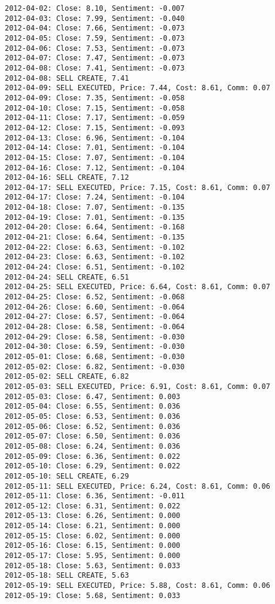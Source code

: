 \documentclass[11pt]{article}
\begin{document}
\begin{Verbatim}[commandchars=\\\{\}]
2012-04-02: Close: 8.10, Sentiment: -0.007
2012-04-03: Close: 7.99, Sentiment: -0.040
2012-04-04: Close: 7.66, Sentiment: -0.073
2012-04-05: Close: 7.59, Sentiment: -0.073
2012-04-06: Close: 7.53, Sentiment: -0.073
2012-04-07: Close: 7.47, Sentiment: -0.073
2012-04-08: Close: 7.41, Sentiment: -0.073
2012-04-08: SELL CREATE, 7.41
2012-04-09: SELL EXECUTED, Price: 7.44, Cost: 8.61, Comm: 0.07
2012-04-09: Close: 7.35, Sentiment: -0.058
2012-04-10: Close: 7.15, Sentiment: -0.058
2012-04-11: Close: 7.17, Sentiment: -0.059
2012-04-12: Close: 7.15, Sentiment: -0.093
2012-04-13: Close: 6.96, Sentiment: -0.104
2012-04-14: Close: 7.01, Sentiment: -0.104
2012-04-15: Close: 7.07, Sentiment: -0.104
2012-04-16: Close: 7.12, Sentiment: -0.104
2012-04-16: SELL CREATE, 7.12
2012-04-17: SELL EXECUTED, Price: 7.15, Cost: 8.61, Comm: 0.07
2012-04-17: Close: 7.24, Sentiment: -0.104
2012-04-18: Close: 7.07, Sentiment: -0.135
2012-04-19: Close: 7.01, Sentiment: -0.135
2012-04-20: Close: 6.64, Sentiment: -0.168
2012-04-21: Close: 6.64, Sentiment: -0.135
2012-04-22: Close: 6.63, Sentiment: -0.102
2012-04-23: Close: 6.63, Sentiment: -0.102
2012-04-24: Close: 6.51, Sentiment: -0.102
2012-04-24: SELL CREATE, 6.51
2012-04-25: SELL EXECUTED, Price: 6.64, Cost: 8.61, Comm: 0.07
2012-04-25: Close: 6.52, Sentiment: -0.068
2012-04-26: Close: 6.60, Sentiment: -0.064
2012-04-27: Close: 6.57, Sentiment: -0.064
2012-04-28: Close: 6.58, Sentiment: -0.064
2012-04-29: Close: 6.58, Sentiment: -0.030
2012-04-30: Close: 6.59, Sentiment: -0.030
2012-05-01: Close: 6.68, Sentiment: -0.030
2012-05-02: Close: 6.82, Sentiment: -0.030
2012-05-02: SELL CREATE, 6.82
2012-05-03: SELL EXECUTED, Price: 6.91, Cost: 8.61, Comm: 0.07
2012-05-03: Close: 6.47, Sentiment: 0.003
2012-05-04: Close: 6.55, Sentiment: 0.036
2012-05-05: Close: 6.53, Sentiment: 0.036
2012-05-06: Close: 6.52, Sentiment: 0.036
2012-05-07: Close: 6.50, Sentiment: 0.036
2012-05-08: Close: 6.24, Sentiment: 0.036
2012-05-09: Close: 6.36, Sentiment: 0.022
2012-05-10: Close: 6.29, Sentiment: 0.022
2012-05-10: SELL CREATE, 6.29
2012-05-11: SELL EXECUTED, Price: 6.24, Cost: 8.61, Comm: 0.06
2012-05-11: Close: 6.36, Sentiment: -0.011
2012-05-12: Close: 6.31, Sentiment: 0.022
2012-05-13: Close: 6.26, Sentiment: 0.000
2012-05-14: Close: 6.21, Sentiment: 0.000
2012-05-15: Close: 6.02, Sentiment: 0.000
2012-05-16: Close: 6.15, Sentiment: 0.000
2012-05-17: Close: 5.95, Sentiment: 0.000
2012-05-18: Close: 5.63, Sentiment: 0.033
2012-05-18: SELL CREATE, 5.63
2012-05-19: SELL EXECUTED, Price: 5.88, Cost: 8.61, Comm: 0.06
2012-05-19: Close: 5.68, Sentiment: 0.033

\end{Verbatim}
\end{document}
